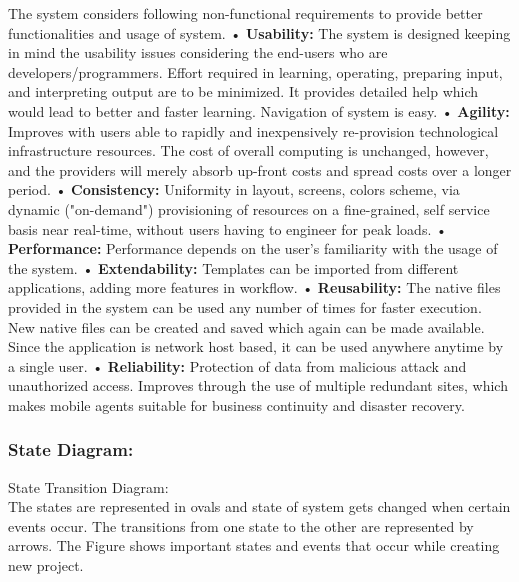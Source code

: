 \documentclass[10pt,a4paper]
{article}
\numberwithin{table}{section}
\begin{document}
{{\begin{normalsize}
\begin{itemize}
    	The system considers following non-functional requirements to provide better functionalities and usage of system.
\newline •	\textbf{Usability:} The system is designed keeping in mind the usability issues considering the end-users who are developers/programmers. Effort required in learning, operating, preparing input, and interpreting output are to be minimized. It provides detailed help which would lead to better and faster learning. Navigation of system is easy.
\newline •	\textbf{Agility: }Improves with users able to rapidly and inexpensively re-provision technological infrastructure resources. The cost of overall computing is unchanged, however, and the providers will merely absorb up-front costs and spread costs over a longer period.
\newline •	\textbf{Consistency:} Uniformity in layout, screens, colors scheme, via dynamic ("on-demand") provisioning of resources on a fine-grained, self service basis near real-time, without users having to engineer for peak loads.
\newline •	\textbf{Performance:} Performance depends on the user’s familiarity with the usage of the system.
\newline •	\textbf{Extendability:} Templates can be imported from different applications, adding more features in workflow.   
\newline •	\textbf{Reusability:} The native files provided in the system can be used any number of times for faster execution. New native files can be created and saved which again can be made available. Since the application is network host based, it can be used anywhere anytime by a single user.
\newline •	\textbf{Reliability:} Protection of data from malicious attack and unauthorized access. Improves through the use of multiple redundant sites, which makes mobile agents suitable for business continuity and disaster recovery.

\end{itemize} 

\subsubsection{State Diagram:}	
  State Transition Diagram:\\
\hspace*{0.3cm}The states are represented in ovals and state of system gets changed when certain events occur. The transitions from one state to the other are represented by arrows. The Figure    shows important states and events that occur while creating new project.


\end{normalsize}}}
\end{document}
